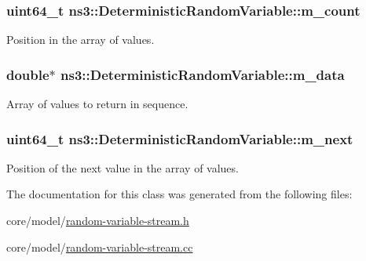 \subsubsection[{\texorpdfstring{m\+\_\+count}{m_count}}]{\setlength{\rightskip}{0pt plus 5cm}uint64\+\_\+t ns3\+::\+Deterministic\+Random\+Variable\+::m\+\_\+count\hspace{0.3cm}{\ttfamily [private]}}\hypertarget{classns3_1_1DeterministicRandomVariable_a12fcc72ca7ca0cf15902dfbba0ad22b1}{}\label{classns3_1_1DeterministicRandomVariable_a12fcc72ca7ca0cf15902dfbba0ad22b1}
Position in the array of values. 
\subsubsection[{\texorpdfstring{m\+\_\+data}{m_data}}]{\setlength{\rightskip}{0pt plus 5cm}double$\ast$ ns3\+::\+Deterministic\+Random\+Variable\+::m\+\_\+data\hspace{0.3cm}{\ttfamily [private]}}\hypertarget{classns3_1_1DeterministicRandomVariable_ace75f5e6ad8dede93af88662d0009d99}{}\label{classns3_1_1DeterministicRandomVariable_ace75f5e6ad8dede93af88662d0009d99}
Array of values to return in sequence. 
\subsubsection[{\texorpdfstring{m\+\_\+next}{m_next}}]{\setlength{\rightskip}{0pt plus 5cm}uint64\+\_\+t ns3\+::\+Deterministic\+Random\+Variable\+::m\+\_\+next\hspace{0.3cm}{\ttfamily [private]}}\hypertarget{classns3_1_1DeterministicRandomVariable_adbde3840cf467ef47e7f992a60889370}{}\label{classns3_1_1DeterministicRandomVariable_adbde3840cf467ef47e7f992a60889370}
Position of the next value in the array of values. 

The documentation for this class was generated from the following files\+:\begin{DoxyCompactItemize}
\item 
core/model/\hyperlink{random-variable-stream_8h}{random-\/variable-\/stream.\+h}\item 
core/model/\hyperlink{random-variable-stream_8cc}{random-\/variable-\/stream.\+cc}\end{DoxyCompactItemize}
